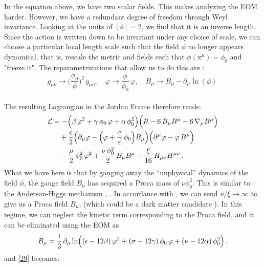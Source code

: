 \documentclass[aps,prd,reprint,preprintnumbers,showpacs,floatfix,nofootinbib,superscript address]{revtex4-2}
\begin{document}
In the equation above, we have two scalar fields. This makes analyzing the EOM harder. However, we have a redundant degree of freedom through Weyl invariance. Looking at the units of $[\phi] = 2$, we find that it is an inverse length. Since the action is written down to be invariant under any choice of scale, we can choose a particular local length scale such that the field $\phi$ no longer appears dynamical, that is, rescale the metric and fields such that $\phi(\text{x}^\mu) = \phi_0$ and "freeze it". The reparametrizations that allow us to do this are :
\[
    g_{\mu \nu}\rightarrow \bigg(\frac{\phi_0}{\phi}\bigg)^2\,g_{\mu \nu},\quad 
    \varphi\rightarrow\frac{\phi}{\phi_0}\,\varphi,\quad 
    B_{\mu}\rightarrow B_{\mu} - \partial_{\mu}\ln(\phi)\ \nonumber
\]
\\
The resulting Lagrangian in the Jordan Frame therefore reads:
\begin{equation}\label{29}
\begin{aligned}
\mathcal{L} &= -\Bigl(\beta\, \varphi^2 + \gamma\, \phi_0\, \varphi + \alpha\, \phi_0^2\Bigr)
\Bigl(R - 6\, B_{\mu} B^{\mu} - 6\, \nabla_{\mu} B^\mu\Bigr) \\
&\quad + \frac{\epsilon}{2} \Bigl(\partial_{\mu}\varphi - \Bigl(\varphi + \frac{\sigma}{\epsilon}\,\phi_0\Bigr)B_{\mu}\Bigr)
\Bigl(\partial^{\mu}\varphi - \varphi\,B^{\mu}\Bigr) \\
&\quad - \frac{\mu}{2}\, \phi_0^2\,\varphi^2 
+ \frac{\nu\,\phi_0^2}{2}\,B_{\mu} B^{\mu} 
- \frac{\xi}{16}\,H_{\mu\nu} H^{\mu\nu}\,.
\end{aligned}
\end{equation}
What we have here is that by gauging away the ``unphysical'' dynamics of the field $\phi$, the gauge field $B_\mu$ has acquired a Proca mass of $\nu \phi_0^2$. This is similar to the Anderson-Higgs mechanism \cite{anderson_plasmons_1963}, \cite{higgs_broken_1964}. In accordance with \cite{barker2024poincaregaugetheoryconformal}, we can send $\nu/\xi \rightarrow \infty$ to give us a Proca field $B_\mu$, (which could be a dark matter candidate \cite{Lasenby_2016}). In this regime, we can neglect the kinetic term corresponding to the Proca field, and it can be eliminated using the EOM as
\begin{equation}\label{30}
B_\mu = \frac{1}{2}\,\partial_\mu \ln\Bigl((\epsilon-12\beta)\,\varphi^2 + (\sigma-12\gamma)\,\phi_0\,\varphi + (\nu-12\alpha)\,\phi_0^2\Bigr)\,.
\end{equation}
and \ref{29} becomes:
\end{document}
